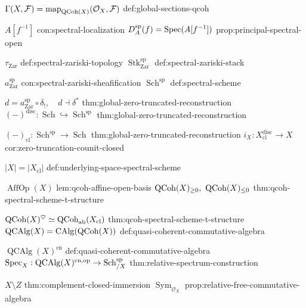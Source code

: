 \begin{longtable}
\NotationSingle
{\(\Gamma(X,\mathcal F)=\operatorname{map}_{\operatorname{QCoh}(X)}(\mathcal O_X,\mathcal F)\)}
{def:global-sections-qcoh}



\NotationPair
{\(A[f^{-1}]\)}
{con:spectral-localization}
{\(D_A^{\mathrm{sp}}(f)=\operatorname{Spec}(A[f^{-1}])\)}
{prop:principal-spectral-open}

\NotationPair
{\(\tau_{\mathrm{Zar}}\)}
{def:spectral-zariski-topology}
{\(\operatorname{Stk}^{\mathrm{sp}}_{\mathrm{Zar}}\)}
{def:spectral-zariski-stack}

\NotationPair
{\(a^{\mathrm{sp}}_{\mathrm{Zar}}\)}
{con:spectral-zariski-sheafification}
{\(\operatorname{Sch}^{\mathrm{sp}}\)}
{def:spectral-scheme}

\NotationPair
{\(d=a^{\mathrm{sp}}_{\mathrm{Zar}}\circ\delta_!,\quad d\dashv\delta^*\)}
{thm:global-zero-truncated-reconstruction}
{\((-)^{\mathrm{disc}}:\operatorname{Sch}\hookrightarrow\operatorname{Sch}^{\mathrm{sp}}\)}
{thm:global-zero-truncated-reconstruction}

\NotationPair
{\((-)_{\mathrm{cl}}:\operatorname{Sch}^{\mathrm{sp}}\to\operatorname{Sch}\)}
{thm:global-zero-truncated-reconstruction}
{\(i_X:X_{\mathrm{cl}}^{\mathrm{disc}}\to X\)}
{cor:zero-truncation-counit-closed}

\NotationSingle
{\(|X|=|X_{\mathrm{cl}}|\)}
{def:underlying-space-spectral-scheme}



\NotationPair
{\(\operatorname{AffOp}(X)\)}
{lem:qcoh-affine-open-basis}
{\(\operatorname{QCoh}(X)_{\geq0},\ \operatorname{QCoh}(X)_{\leq0}\)}
{thm:qcoh-spectral-scheme-t-structure}

\NotationPair
{\(\operatorname{QCoh}(X)^\heartsuit\simeq\operatorname{QCoh}_{\mathrm{ab}}(X_{\mathrm{cl}})\)}
{thm:qcoh-spectral-scheme-t-structure}
{\(\operatorname{QCAlg}(X)=\operatorname{CAlg}(\operatorname{QCoh}(X))\)}
{def:quasi-coherent-commutative-algebra}

\NotationPair
{\(\operatorname{QCAlg}(X)^{\mathrm{cn}}\)}
{def:quasi-coherent-commutative-algebra}
{\(\operatorname{Spec}_X:\operatorname{QCAlg}(X)^{\mathrm{cn},\mathrm{op}}\to\operatorname{Sch}^{\mathrm{sp}}_{/X}\)}
{thm:relative-spectrum-construction}



\NotationPair
{\(X\setminus Z\)}
{thm:complement-closed-immersion}
{\(\operatorname{Sym}_{\mathcal O_X}\)}
{prop:relative-free-commutative-algebra}


\end{longtable}
